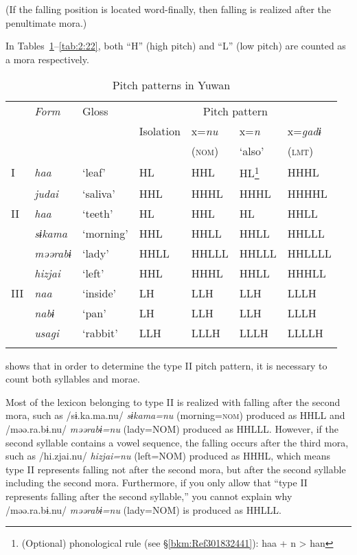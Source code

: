 (If the falling position is located word-finally, then falling is realized after the penultimate mora.)

In Tables~\ref{tab:2:20}--\ref{tab:2:22}, both “H” (high pitch) and “L” (low pitch) are counted as a mora respectively.

\begin{table}
\caption{Pitch patterns in Yuwan\label{tab:2:20}}
\begin{tabular}{ l >{\itshape}l *{5}{l} }  
\lsptoprule
&  \normalfont Form & Gloss & \multicolumn{4}{c}{Pitch pattern}\\\cmidrule(lr){4-7} 
     &                     & & Isolation &  x=\textit{nu} &  x=\textit{n} &  x=\textit{gadɨ}\\
     &                     & &          &   (\textsc{nom}) &  ‘also’ &  (\textsc{lmt})\\\midrule
I & \itshape haa &  ‘leaf’ &  HL &  HHL &  HL\footnote{(Optional) phonological rule (see §\ref{bkm:Ref301832441}): haa + n > han} &  HHHL\\
  & judai &  ‘saliva’ &  HHL &  HHHL &  HHHL &  HHHHL\\
II & \itshape haa &  ‘teeth’ &  HL &  HHL &  HL &  HHLL\\
  & sɨkama &  ‘morning’ &  HHL &  HHLL &  HHLL &  HHLLL\\
  & məərabɨ &  ‘lady’ &  HHLL &  HHLLL &  HHLLL &  HHLLLL\\
  & hizjai &  ‘left’ &  HHL &  HHHL &  HHLL &  HHHLL\\
III & \itshape naa &  ‘inside’ &  LH &  LLH &  LLH &  LLLH\\
  & nabɨ &  ‘pan’ &  LH &  LLH &  LLH &  LLLH\\
  & usagi &  ‘rabbit’ &  LLH &  LLLH &  LLLH &  LLLLH\\
\lspbottomrule
\end{tabular}
\end{table}

 shows that in order to determine the type II pitch pattern, it is necessary to count both syllables and morae.

Most of the lexicon belonging to type II is realized with falling after the second mora, such as /sɨ.ka.ma.nu/ \textit{sɨkama=nu} (morning=\textsc{nom}) produced as HHLL and /məə.ra.bɨ.nu/ \textit{məərabɨ=nu} (lady=NOM) produced as HHLLL. However, if the second syllable contains a vowel sequence, the falling occurs after the third mora, such as /hi.zjai.nu/ \textit{hizjai=nu} (left=NOM) produced as HHHL, which means type II represents falling not after the second mora, but after the second syllable including the second mora. Furthermore, if you only allow that “type II represents falling after the second syllable,” you cannot explain why /məə.ra.bɨ.nu/ \textit{məərabɨ=nu} (lady=NOM) is produced as HHLLL.

